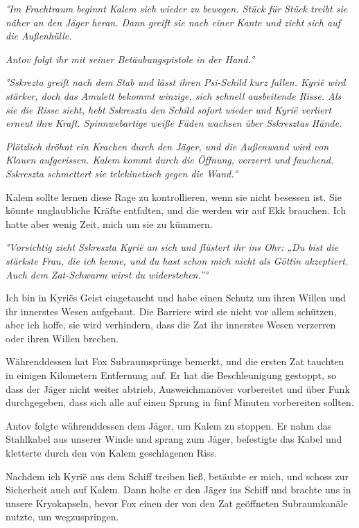 \documentclass[11pt]{article}
\begin{document}
\emph{°Im Frachtraum beginnt Kalem sich wieder zu bewegen. Stück für
Stück treibt sie näher an den Jäger heran. Dann greift sie nach einer
Kante und zieht sich auf die Außenhülle.}

\emph{Antov folgt ihr mit seiner Betäubungspistole in der Hand.°}

\emph{°Sskrezta greift nach dem Stab und lässt ihren Psi-Schild kurz
fallen. Kyrië wird stärker, doch das Amulett bekommt winzige, sich
schnell ausbeitende Risse. Als sie die Risse sieht, hebt Sskreszta den
Schild sofort wieder und Kyrië verliert erneut ihre Kraft.
Spinnwebartige weiße Fäden wachsen über Sskresztas Hände.}

\emph{Plötzlich dröhnt ein Krachen durch den Jäger, und die Außenwand
wird von Klauen aufgerissen. Kalem kommt durch die Öffnung, verzerrt und
fauchend. Sskreszta schmettert sie telekinetisch gegen die Wand.°}

Kalem sollte lernen diese Rage zu kontrollieren, wenn sie nicht besessen
ist. Sie könnte unglaubliche Kräfte entfalten, und die werden wir auf
Ekk brauchen. Ich hatte aber wenig Zeit, mich um sie zu kümmern.

\emph{°Vorsichtig zieht Sskreszta Kyrië an sich und flüstert ihr ins
Ohr: „Du bist die stärkste Frau, die ich kenne, und du hast schon mich
nicht als Göttin akzeptiert. Auch dem Zat-Schwarm wirst du
widerstehen.''°}

Ich bin in Kyriës Geist eingetaucht und habe einen Schutz um ihren
Willen und ihr innerstes Wesen aufgebaut. Die Barriere wird sie nicht
vor allem schützen, aber ich hoffe, sie wird verhindern, dass die Zat
ihr innerstes Wesen verzerren oder ihren Willen brechen.

Währenddessen hat Fox Subraumsprünge bemerkt, und die ersten Zat
tauchten in einigen Kilometern Entfernung auf. Er hat die Beschleunigung
gestoppt, so dass der Jäger nicht weiter abtrieb, Ausweichmanöver
vorbereitet und über Funk durchgegeben, dass sich alle auf einen Sprung
in fünf Minuten vorbereiten sollten.

Antov folgte währenddessen dem Jäger, um Kalem zu stoppen. Er nahm das
Stahlkabel aus unserer Winde und sprang zum Jäger, befestigte das Kabel
und kletterte durch den von Kalem geschlagenen Riss.

Nachdem ich Kyrië aus dem Schiff treiben ließ, betäubte er mich, und
schoss zur Sicherheit auch auf Kalem. Dann holte er den Jäger ins Schiff
und brachte uns in unsere Kryokapseln, bevor Fox einen der von den Zat
geöffneten Subraumkanäle nutzte, um wegzuspringen.
\end{document}
